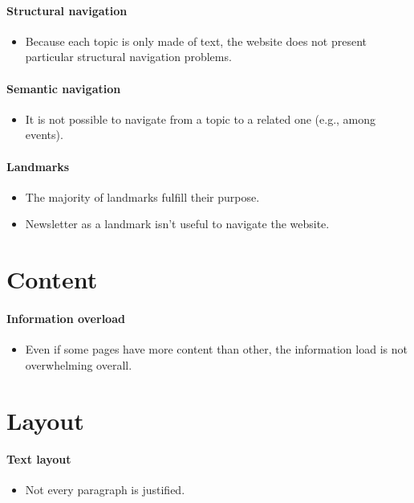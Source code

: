 \documentclass[a4paper, 11pt, parskip=half, headsepline]{scrreprt}
\begin{document}
\paragraph{Structural navigation}
\begin{itemize}
    \item Because each topic is only made of text, the website does not present particular structural navigation problems.
\end{itemize}

\paragraph{Semantic navigation}
\begin{itemize}
    \item It is not possible to navigate from a topic to a related one (e.g., among events).
\end{itemize}

\paragraph{Landmarks}
\begin{itemize}
    \item The majority of landmarks fulfill their purpose.
    \item Newsletter as a landmark isn't useful to navigate the website.
\end{itemize}

\section{Content}

\paragraph{Information overload}
\begin{itemize}
    \item Even if some pages have more content than other, the information load is not overwhelming overall.
\end{itemize}

\section{Layout}

\paragraph{Text layout}
\begin{itemize}
    \item Not every paragraph is justified.
\end{itemize}
\end{document}
